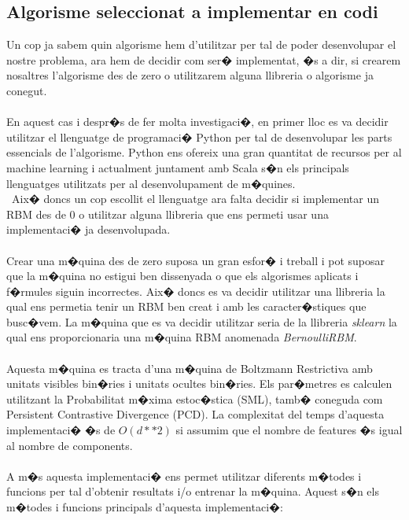\documentclass[12pt,a4paper,openright,oneside]{article}
\numberwithin{equation}{section}
\theoremstyle{definition}
\begin{document}
\subsection{Algorisme seleccionat a implementar en codi}
Un cop ja sabem quin algorisme hem d'utilitzar per tal de poder desenvolupar el nostre problema, ara hem de decidir com ser� implementat, �s a dir, si crearem nosaltres l'algorisme des de zero o utilitzarem alguna llibreria o algorisme ja conegut. \\\\
En aquest cas i despr�s de fer molta investigaci�, en primer lloc es va decidir utilitzar el llenguatge de programaci� Python per tal de desenvolupar les parts essencials de l'algorisme. Python ens ofereix una gran quantitat de recursos per al machine learning i actualment juntament amb Scala s�n els principals llenguatges utilitzats per al desenvolupament de m�quines.\\\
Aix� doncs un cop escollit el llenguatge ara falta decidir si implementar un RBM des de 0 o utilitzar alguna llibreria que ens permeti usar una implementaci� ja desenvolupada. \\\\
Crear una m�quina des de zero suposa un gran esfor� i treball i pot suposar que la m�quina no estigui ben dissenyada o que els algorismes aplicats i f�rmules siguin incorrectes. Aix� doncs es va decidir utilitzar una llibreria la qual ens permetia tenir un RBM ben creat i amb les caracter�stiques que busc�vem. La m�quina que es va decidir utilitzar seria de la llibreria \textit{sklearn} la qual ens proporcionaria una m�quina RBM anomenada \textit{BernoulliRBM}\cite{sklearnRBM}. \\\\
Aquesta m�quina es tracta d'una m�quina de Boltzmann Restrictiva amb unitats visibles bin�ries i unitats ocultes bin�ries. Els par�metres es calculen utilitzant la Probabilitat m�xima estoc�stica (SML), tamb� coneguda com Persistent Contrastive Divergence (PCD). La complexitat del temps d'aquesta implementaci� �s de ${O(d \ast \ast 2)}$ si assumim que el nombre de features �s igual al nombre de components.\\\\
A m�s aquesta implementaci� ens permet utilitzar diferents m�todes i funcions per tal d'obtenir resultats i/o entrenar la m�quina. Aquest s�n els m�todes i funcions principals d'aquesta implementaci�:
\end{document}

